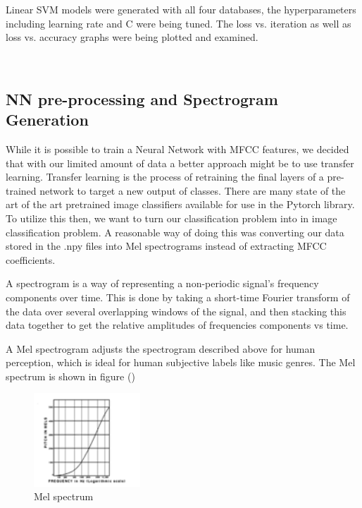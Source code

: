 \documentclass[letterpaper, 12 pt, conference]{ieeeconf}  %
\begin{document}
Linear SVM models were generated with all four databases, the hyperparameters including learning rate and C were being tuned. The loss vs. iteration as well as loss vs. accuracy graphs were being plotted and examined. 

\newline \,\,

\subsection{NN pre-processing and Spectrogram Generation}

While it is possible to train a Neural Network with MFCC features, we decided that with our limited amount of data a better approach might be to use transfer learning. Transfer learning is the process of retraining the final layers of a pre-trained network to target a new output of classes. There are many state of the art of the art pretrained image classifiers available for use in the Pytorch library. To utilize this then, we want to turn our classification problem into in image classification problem. A reasonable way of doing this was converting our data stored in the .npy files into Mel spectrograms instead of extracting MFCC coefficients.

A spectrogram is a way of representing a non-periodic signal’s frequency components over time. This is done by taking a short-time Fourier transform of the data over several overlapping windows of the signal, and then stacking this data together to get the relative amplitudes of frequencies components vs time. 

A Mel spectrogram adjusts the spectrogram described above for human perception, which is ideal for human subjective labels like music genres. The Mel spectrum is shown in figure ()

\begin{figure}
\begin{center}
    \includegraphics[width=4cm]{melspectrum.png}
\caption{Mel spectrum}
\end{center}

\end{figure}
\end{document}
